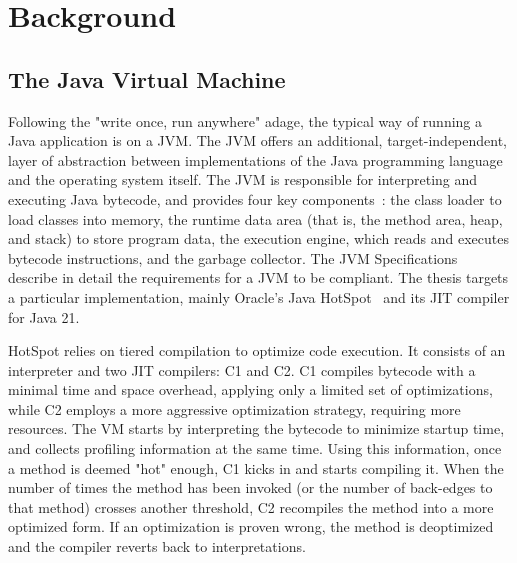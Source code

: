 \chapter{Background}


\section{The Java Virtual Machine}
Following the "write once, run anywhere" adage, the typical way of running a Java application is on a JVM.
The JVM offers an additional, target-independent, layer of abstraction between implementations of the Java programming language~\cite{noauthor_java_nodate-1} and the operating system itself.
The JVM is responsible for interpreting and executing Java bytecode, and provides four key components~\cite{dannarapu_jvm_2023-1}: 
the class loader to load classes into memory, the runtime data area (that is, the method area, heap, and stack) to store program data, the execution engine, which reads and executes bytecode instructions, and the garbage collector. The JVM Specifications~\cite{noauthor_java_nodate-2} describe in detail the requirements for a JVM to be compliant. 
The thesis targets a particular implementation, mainly Oracle's Java HotSpot~\cite{noauthor_hotspot_nodate} and its JIT compiler for Java 21. 

HotSpot relies on tiered compilation to optimize code execution. It consists of an interpreter and two JIT compilers: C1 and C2. 
C1 compiles bytecode with a minimal time and space overhead, applying only a limited set of optimizations, while C2 employs a more aggressive optimization strategy, requiring more resources.
The VM starts by interpreting the bytecode to minimize startup time, and collects profiling information at the same time. Using this information, once a method is deemed "hot" enough, C1 kicks in and starts compiling it. When the number of times the method has been invoked (or the number of back-edges to that method) crosses another threshold, C2 recompiles the method into a more optimized form. If an optimization is proven wrong, the method is deoptimized and the compiler reverts back to interpretations.  

